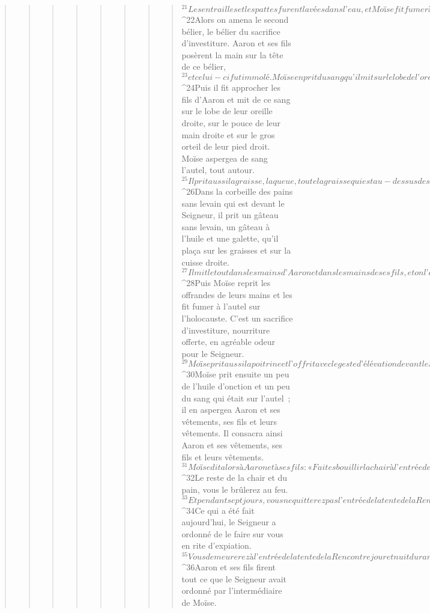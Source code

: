 \begin{verse}
\begin{verse}
\begin{verse}
\begin{verse}
\begin{verse}
\begin{verse}
\begin{verse}
\begin{verse}
${}^{21}Les entrailles et les pattes furent lavées dans l’eau, et Moïse fit fumer à l’autel le bélier tout entier. C’est un holocauste, nourriture offerte, en agréable odeur pour le Seigneur, comme le Seigneur l’avait ordonné à Moïse.
${}^{22}Alors on amena le second bélier, le bélier du sacrifice d’investiture. Aaron et ses fils posèrent la main sur la tête de ce bélier, 
${}^{23}et celui-ci fut immolé. Moïse en prit du sang qu’il mit sur le lobe de l’oreille droite d’Aaron, sur le pouce de sa main droite et sur le gros orteil de son pied droit. 
${}^{24}Puis il fit approcher les fils d’Aaron et mit de ce sang sur le lobe de leur oreille droite, sur le pouce de leur main droite et sur le gros orteil de leur pied droit. Moïse aspergea de sang l’autel, tout autour. 
${}^{25}Il prit aussi la graisse, la queue, toute la graisse qui est au-dessus des entrailles, le lobe du foie et les deux rognons avec leur graisse, ainsi que la cuisse droite. 
${}^{26}Dans la corbeille des pains sans levain qui est devant le Seigneur, il prit un gâteau sans levain, un gâteau à l’huile et une galette, qu’il plaça sur les graisses et sur la cuisse droite. 
${}^{27}Il mit le tout dans les mains d’Aaron et dans les mains de ses fils, et on l’offrit avec le geste d’élévation devant le Seigneur. 
${}^{28}Puis Moïse reprit les offrandes de leurs mains et les fit fumer à l’autel sur l’holocauste. C’est un sacrifice d’investiture, nourriture offerte, en agréable odeur pour le Seigneur. 
${}^{29}Moïse prit aussi la poitrine et l’offrit avec le geste d’élévation devant le Seigneur. Cette part du bélier d’investiture est pour Moïse, comme le Seigneur l’avait ordonné à Moïse.
${}^{30}Moïse prit ensuite un peu de l’huile d’onction et un peu du sang qui était sur l’autel ; il en aspergea Aaron et ses vêtements, ses fils et leurs vêtements. Il consacra ainsi Aaron et ses vêtements, ses fils et leurs vêtements.
${}^{31}Moïse dit alors à Aaron et à ses fils : « Faites bouillir la chair à l’entrée de la tente de la Rencontre ; c’est là que vous la mangerez, avec le pain qui est dans la corbeille de l’investiture, comme je l’ai ordonné en disant : “Aaron et ses fils la mangeront.” 
${}^{32}Le reste de la chair et du pain, vous le brûlerez au feu. 
${}^{33}Et pendant sept jours, vous ne quitterez pas l’entrée de la tente de la Rencontre, jusqu’au moment où s’achèvera le temps de votre investiture, car votre investiture durera sept jours. 
${}^{34}Ce qui a été fait aujourd’hui, le Seigneur a ordonné de le faire sur vous en rite d’expiation. 
${}^{35}Vous demeurerez à l’entrée de la tente de la Rencontre jour et nuit durant sept jours, en gardant les observances du Seigneur, et vous ne mourrez pas. C’est en effet ce qui m’a été ordonné. »
${}^{36}Aaron et ses fils firent tout ce que le Seigneur avait ordonné par l’intermédiaire de Moïse.
      

\end{verse}
\end{verse}
\end{verse}
\end{verse}
\end{verse}
\end{verse}
\end{verse}
\end{verse}
